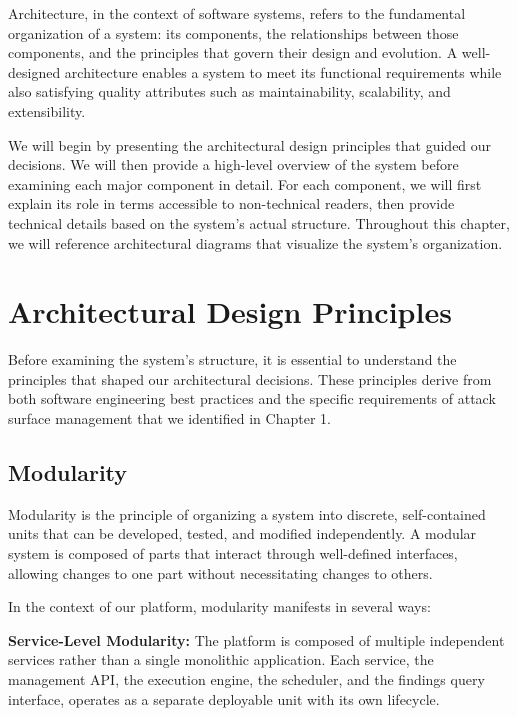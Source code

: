 \documentclass[a4paper,12pt]{report}
\begin{document}
Architecture, in the context of software systems, refers to the fundamental organization of a system: its components, the relationships between those components, and the principles that govern their design and evolution. A well-designed architecture enables a system to meet its functional requirements while also satisfying quality attributes such as maintainability, scalability, and extensibility.\hfill \break

We will begin by presenting the architectural design principles that guided our decisions. We will then provide a high-level overview of the system before examining each major component in detail. For each component, we will first explain its role in terms accessible to non-technical readers, then provide technical details based on the system's actual structure. Throughout this chapter, we will reference architectural diagrams\cite{uml_diagrams} that visualize the system's organization.

\section{Architectural Design Principles}

Before examining the system's structure, it is essential to understand the principles that shaped our architectural decisions. These principles derive from both software engineering best practices and the specific requirements of attack surface management that we identified in Chapter 1.

\subsection{Modularity}

Modularity is the principle of organizing a system into discrete, self-contained units that can be developed, tested, and modified independently. A modular system is composed of parts that interact through well-defined interfaces, allowing changes to one part without necessitating changes to others.\hfill \break

In the context of our platform, modularity manifests in several ways:\hfill \break

\textbf{Service-Level Modularity:} The platform is composed of multiple independent services rather than a single monolithic application. Each service, the management API, the execution engine, the scheduler, and the findings query interface, operates as a separate deployable unit with its own lifecycle.\hfill \break
\end{document}
